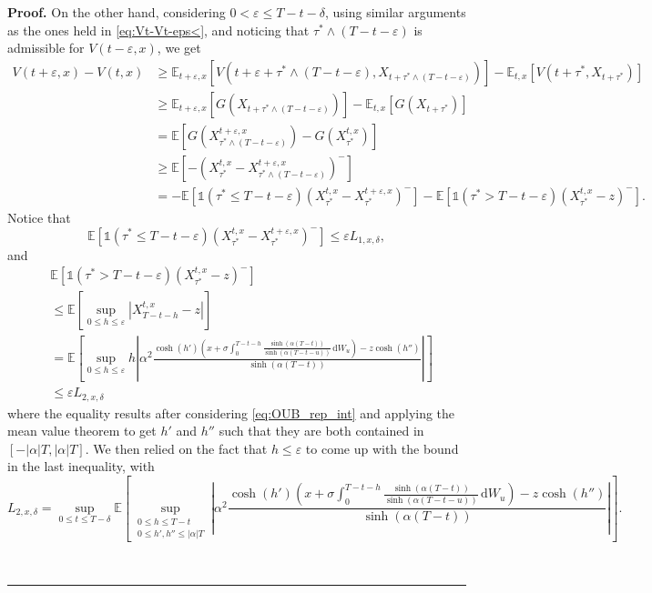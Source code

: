 \documentclass{tufte-handout}
\newcommand{\E}{\mathbb{E}} %
\newenvironment{pf}[1][Proof]{\textbf{#1.} }{\ \rule{0.5em}{0.5em}}
\begin{document}
\begin{pf}
		On the other hand, considering $0 < \varepsilon \leq T - t - \delta$, using similar arguments as the ones held in \eqref{eq:Vt-Vt-eps<}, and noticing that $\tau^*\wedge(T - t - \varepsilon)$ is admissible for $V(t - \varepsilon, x)$, we get
		\begin{align}
		V(t + \varepsilon, x) - V(t, x) &\geq \E_{t + \varepsilon, x}\left[V\left(t + \varepsilon + \tau^*\wedge(T - t - \varepsilon), X_{t + \tau^*\wedge(T - t - \varepsilon)}\right)\right] - \E_{t, x}\left[V\left(t + \tau^*, X_{t + \tau^*}\right)\right] \nonumber \\
		&\geq \E_{t + \varepsilon, x}\left[G\left(X_{t + \tau^*\wedge(T - t - \varepsilon)}\right)\right] - \E_{t, x}\left[G\left(X_{t + \tau^*}\right)\right] \nonumber \\
		&= \E\left[G\left(X_{\tau^*\wedge(T - t - \varepsilon)}^{t + \varepsilon, x}\right) - G\left(X_{\tau^*}^{t, x}\right)\right] \nonumber \\
		&\geq \E\left[-\left(X_{\tau^*}^{t, x} - X_{\tau^*\wedge(T - t -\varepsilon)}^{t + \varepsilon, x}\right)^-\right] \nonumber \\
		&= -\E\left[\mathbb{1}(\tau^*\leq T - t - \varepsilon)\left(X_{\tau^*}^{t, x} - X_{\tau^*}^{t + \varepsilon, x}\right)^-\right] - \E\left[\mathbb{1}(\tau^* > T - t - \varepsilon)\left(X_{\tau^*}^{t, x} - z\right)^-\right]. \label{eq:Vt+eps-Vt>}
		\end{align}
		Notice that
		$$
		\E\left[\mathbb{1}(\tau^*\leq T - t - \varepsilon)\left(X_{\tau^*}^{t, x} - X_{\tau^*}^{t + \varepsilon, x}\right)^-\right] \leq \varepsilon L_{1, x, \delta},
		$$
		and
		\begin{align}
			&\E\left[\mathbb{1}(\tau^* > T - t - \varepsilon)\left(X_{\tau^*}^{t, x} - z\right)^-\right] \nonumber \\
			&\leq \E\left[\sup_{0 \leq h\leq \varepsilon}\left|X_{T - t - h}^{t, x} - z\right|\right] \nonumber \\
			&= \E\left[\sup_{0 \leq h\leq \varepsilon}h\left|\alpha^2\frac{\cosh(h')\left(x + \sigma\int_{0}^{T - t -h} \frac{\sinh(\alpha (T - t))}{\sinh(\alpha (T - t - u))}\,\mathrm{d}W_u\right) - z\cosh(h'')}{\sinh(\alpha (T - t))}\right|\right] \nonumber \\
			&\leq \varepsilon L_{2, x, \delta} \nonumber
		\end{align}
		where the equality results after considering \eqref{eq:OUB_rep_int} and applying the mean value theorem to get $h'$ and $h''$ such that they are both contained in $[-|\alpha|T, |\alpha|T]$. We then relied on the fact that $h \leq \varepsilon$ to come up with the bound in the last inequality, with
		$$
		L_{2, x, \delta} = \sup_{0\leq t \leq T - \delta}\E\left[\sup_{\substack{0 \leq h \leq T - t \\ 0 \leq h', h'' \leq |\alpha|T}}\left|\alpha^2\frac{\cosh(h')\left(x + \sigma\int_{0}^{T - t - h} \frac{\sinh(\alpha (T - t))}{\sinh(\alpha (T - t - u))}\,\mathrm{d}W_u\right) - z\cosh(h'')}{\sinh(\alpha (T - t))}\right|\right].
		$$


\end{pf}
\end{document}
